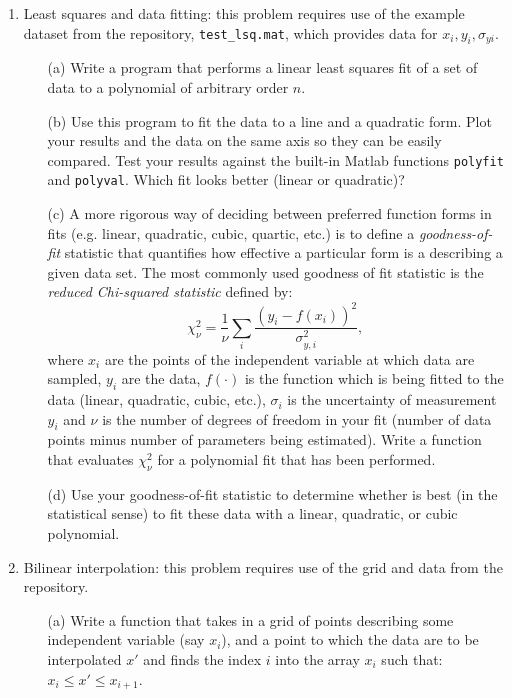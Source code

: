 \documentclass{article}
\begin{document}
\pagebreak

\begin{enumerate}
  \item Least squares and data fitting:  this problem requires use of the example dataset from the repository, \texttt{test\_lsq.mat}, which provides data for $x_i,y_i,\sigma_{yi}$.  
  \begin{itemize}
    \item[(a)] Write a program that performs a linear least squares fit of a set of data to a polynomial of arbitrary order $n$.
    \item[(b)] Use this program to fit the data to a line and a quadratic form.  Plot your results and the data on the same axis so they can be easily compared.  Test your results against the built-in Matlab functions \texttt{polyfit} and \texttt{polyval}.  Which fit looks better (linear or quadratic)?  
    \item[(c)] A more rigorous way of deciding between preferred function forms in fits (e.g. linear, quadratic, cubic, quartic, etc.) is to define a \emph{goodness-of-fit} statistic that quantifies how effective a particular form is a describing a given data set.  The most commonly used goodness of fit statistic is the \emph{reduced Chi-squared statistic} defined by:  
    \begin{equation}
      \chi^2_\nu = \frac{1}{\nu} \sum_i \frac{\left( y_i - f(x_i) \right) ^2}{\sigma_{y,i}^2},
    \end{equation}
    where $x_i$ are the points of the independent variable at which data are sampled, $y_i$ are the data, $f(\cdot)$ is the function which is being fitted to the data (linear, quadratic, cubic, etc.), $\sigma_i$ is the uncertainty of measurement $y_i$ and $\nu$ is the number of degrees of freedom in your fit (number of data points minus number of parameters being estimated).  Write a function that evaluates $\chi^2_\nu$ for a polynomial fit that has been performed.  
    \item[(d)] Use your goodness-of-fit statistic to determine whether is best (in the statistical sense) to fit these data with a linear, quadratic, or cubic polynomial.    
  \end{itemize}
  \item Bilinear interpolation:  this problem requires use of the grid and data from the repository.  
  \begin{itemize}
    \item[(a)]  Write a function that takes in a grid of points describing some independent variable (say $x_i$), and a point to which the data are to be interpolated $x'$ and finds the index $i$ into the array $x_i$ such that:  $x_i \le x' \le x_{i+1}$.  

\end{itemize}
\end{enumerate}
\end{document}
